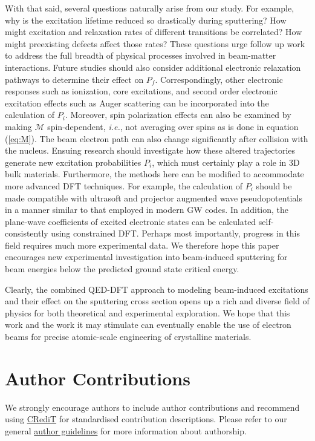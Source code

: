 \documentclass[twoside,twocolumn,9pt]{article}
\begin{document}
With that said,
several questions naturally arise from our study.
For example, why is the excitation lifetime reduced so drastically during
sputtering?
How might excitation and relaxation rates of different transitions be
correlated?
How might preexisting defects affect those rates?
These questions urge follow up work to address the full breadth of physical
processes involved in beam-matter interactions.
Future studies should also consider additional electronic relaxation pathways
to determine their effect on $P_f$.
Correspondingly, other electronic responses such as ionization, core
excitations, and second order electronic excitation effects such as Auger
scattering can be incorporated into the calculation of $P_i$.
\cite{Lagarde2014,Kozawa2014,Nie2015,Shi2013b}
Moreover, spin polarization effects can also be examined by making $\mathcal{M}$
spin-dependent, \textit{i.e.}, not averaging over spins as is done in equation
(\ref{eq:M}).
The beam electron path can also change significantly after collision with
the nucleus.
Ensuing research should investigate how these altered trajectories generate new
excitation probabilities $P_i$, which must certainly play a role in 3D bulk
materials.
Furthermore, the methods here can be modified to accommodate more advanced DFT
techniques.
For example, the calculation of $P_i$ should be made compatible with ultrasoft
and projector augmented wave pseudopotentials \cite{Blochl1994} in a manner
similar to that employed in modern GW codes.\cite{Shishkin2006a, Gajdos2006,
Paier2005}
In addition, the plane-wave coefficients of excited electronic states can be
calculated self-consistently using constrained DFT.\cite{Kaduk2012}
Perhaps most importantly, progress in this field requires much more experimental
data.
We therefore hope this paper encourages new experimental investigation into
beam-induced sputtering for beam energies below the predicted ground state
critical energy.

Clearly, the combined QED-DFT approach to modeling beam-induced excitations and
their effect on the sputtering cross section opens up a rich and diverse field
of physics for both theoretical and experimental exploration.
We hope that this work and the work it may stimulate can eventually enable the
use of electron beams for precise atomic-scale engineering of crystalline
materials.

\section*{Author Contributions}
\label{sec:contributions}
We strongly encourage authors to include author contributions and recommend
using \href{https://casrai.org/credit/}{CRediT} for standardised contribution
descriptions. Please refer to our general
\href{https://www.rsc.org/journals-books-databases/journal-authors-reviewers/author-responsibilities/}{author
guidelines} for more information about authorship.
\end{document}
